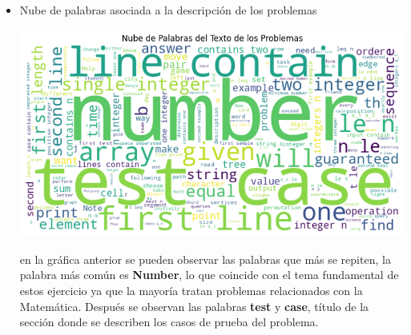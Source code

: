 \documentclass{article}
\begin{document}
\begin{itemize}
    \item Nube de palabras asociada a la descripción de los problemas
          \begin{center}
              \includegraphics[scale=0.55]{imgs/wordcloud.png}
          \end{center}
          en la gráfica anterior se pueden observar las palabras que más se repiten, la palabra más común es \textbf{Number}, lo que coincide con
          el tema fundamental de estos ejercicio ya que la mayoría tratan problemas relacionados con la Matemática. Después se observan las palabras
          \textbf{test} y \textbf{case}, título de la sección donde se describen los casos de prueba del problema.
          \newpage
          

\end{itemize}
\end{document}
